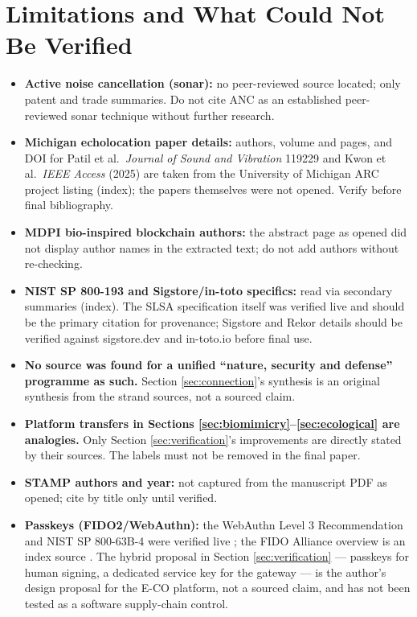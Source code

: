 \documentclass[11pt]{article}
\begin{document}
\section{Limitations and What Could Not Be Verified}
\label{sec:limitations}

\begin{itemize}
\item \textbf{Active noise cancellation (sonar):} no peer-reviewed
source located; only patent and trade summaries. Do not cite ANC as an
established peer-reviewed sonar technique without further research.
\item \textbf{Michigan echolocation paper details:} authors, volume and
pages, and DOI for Patil et al.\ \emph{Journal of Sound and Vibration}
119229 and Kwon et al.\ \emph{IEEE Access} (2025) are taken from the
University of Michigan ARC project listing (index); the papers
themselves were not opened. Verify before final bibliography.
\item \textbf{MDPI bio-inspired blockchain authors:} the abstract page
as opened did not display author names in the extracted text; do not
add authors without re-checking.
\item \textbf{NIST SP 800-193 and Sigstore/in-toto specifics:} read via
secondary summaries (index). The SLSA specification itself was verified
live and should be the primary citation for provenance; Sigstore and
Rekor details should be verified against sigstore.dev and in-toto.io
before final use.
\item \textbf{No source was found for a unified ``nature, security and
defense'' programme as such.} Section \ref{sec:connection}'s synthesis
is an original synthesis from the strand sources, not a sourced claim.
\item \textbf{Platform transfers in Sections
\ref{sec:biomimicry}--\ref{sec:ecological} are analogies.} Only
Section \ref{sec:verification}'s improvements are directly stated by
their sources. The labels must not be removed in the final paper.
\item \textbf{STAMP authors and year:} not captured from the manuscript
PDF as opened; cite by title only until verified.
\item \textbf{Passkeys (FIDO2/WebAuthn):} the WebAuthn Level 3
Recommendation and NIST SP 800-63B-4 were verified live
\cite{webauthn3,nist80063b4}; the FIDO Alliance overview is an index
source \cite{fido-passkeys}. The hybrid proposal
in Section \ref{sec:verification} --- passkeys for human signing, a
dedicated service key for the gateway --- is the author's design
proposal for the E-CO platform, not a sourced claim, and has not been
tested as a software supply-chain control.
\end{itemize}
\end{document}
